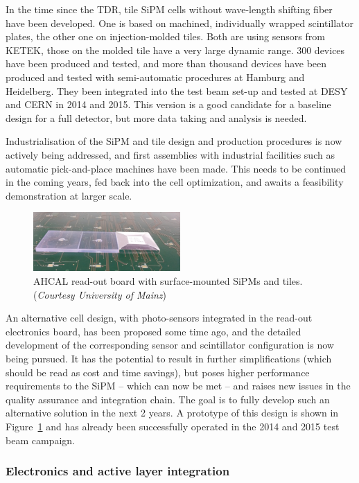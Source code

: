 In the time since the TDR, tile SiPM cells without wave-length shifting fiber have been developed. One is based on machined, individually wrapped scintillator plates, the other one on injection-molded tiles. Both are using sensors from KETEK, those on the molded tile have a very large dynamic range. 300 devices have been produced and tested, and more than thousand devices have been produced and tested with semi-automatic procedures at Hamburg and Heidelberg. They been integrated into the test beam set-up and tested at DESY and CERN in 2014 and 2015. This version is a good candidate for a baseline design for a full detector, but more data taking and analysis is needed.

Industrialisation of the SiPM and tile design and production procedures is now actively being addressed, and first assemblies with industrial facilities such as automatic pick-and-place machines have been made. This needs to be continued in the coming years, fed back into the cell optimization, and awaits a feasibility demonstration at larger scale.

\begin{figure}[htb]
	\centering
	\includegraphics[width=0.5\textwidth]{Calorimeter/AHCAL/SurfaceMountedTiles}
	\caption{AHCAL read-out board with surface-mounted SiPMs and tiles. ({\it Courtesy University of Mainz})}
	\label{fig:Calorimeter:AHCAL:HBU}
\end{figure}

An alternative cell design, with photo-sensors integrated in the read-out electronics board, has been proposed some time ago, and the detailed development of the corresponding sensor and scintillator configuration is now being pursued. It has the potential to result in further simplifications (which should be read as cost and time savings), but poses higher performance requirements to the SiPM -- which can now be met --  and raises new issues in the quality assurance and integration chain. The goal is to fully develop such an alternative solution in the next 2 years. A prototype of this design is shown in Figure~\ref{fig:Calorimeter:AHCAL:HBU} and has already been successfully operated in the 2014 and 2015 test beam campaign.

\subsubsection{Electronics and active layer integration}

